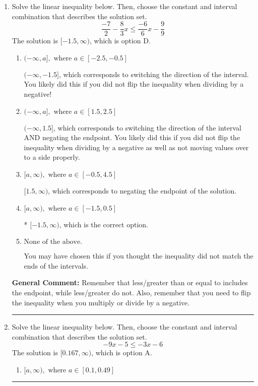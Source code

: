 \documentclass{extbook}[14pt]
\newcommand{\litem}[1]{\item #1

\rule{\textwidth}{0.4pt}}
\begin{document}
\begin{enumerate}
{\begin{enumerate}[label=\Alph*.]
This describes the values no more than 9 from 3
\item \( (-\infty, -6) \cup (12, \infty) \)

This describes the values more than 9 from 3
\item \( (-\infty, -6] \cup [12, \infty) \)

This describes the values no less than 9 from 3
\item \( \text{None of the above} \)

Options A-D described the values [more/less than] 9 units from 3, which is the reverse of what the question asked.
\end{enumerate}

\textbf{General Comment:} When thinking about this language, it helps to draw a number line and try points.
}
\litem{
Solve the linear inequality below. Then, choose the constant and interval combination that describes the solution set.
\[ \frac{-7}{2} - \frac{8}{3} x \leq \frac{-6}{6} x - \frac{9}{9} \]
The solution is \( [-1.5, \infty) \), which is option D.\begin{enumerate}[label=\Alph*.]
\item \( (-\infty, a], \text{ where } a \in [-2.5, -0.5] \)

 $(-\infty, -1.5]$, which corresponds to switching the direction of the interval. You likely did this if you did not flip the inequality when dividing by a negative!
\item \( (-\infty, a], \text{ where } a \in [1.5, 2.5] \)

 $(-\infty, 1.5]$, which corresponds to switching the direction of the interval AND negating the endpoint. You likely did this if you did not flip the inequality when dividing by a negative as well as not moving values over to a side properly.
\item \( [a, \infty), \text{ where } a \in [-0.5, 4.5] \)

 $[1.5, \infty)$, which corresponds to negating the endpoint of the solution.
\item \( [a, \infty), \text{ where } a \in [-1.5, 0.5] \)

* $[-1.5, \infty)$, which is the correct option.
\item \( \text{None of the above}. \)

You may have chosen this if you thought the inequality did not match the ends of the intervals.
\end{enumerate}

\textbf{General Comment:} Remember that less/greater than or equal to includes the endpoint, while less/greater do not. Also, remember that you need to flip the inequality when you multiply or divide by a negative.
}
\litem{
Solve the linear inequality below. Then, choose the constant and interval combination that describes the solution set.
\[ -9x -5 \leq -3x -6 \]
The solution is \( [0.167, \infty) \), which is option A.\begin{enumerate}[label=\Alph*.]
\item \( [a, \infty), \text{ where } a \in [0.1, 0.49] \)


\end{enumerate}}
\end{enumerate}
\end{document}
